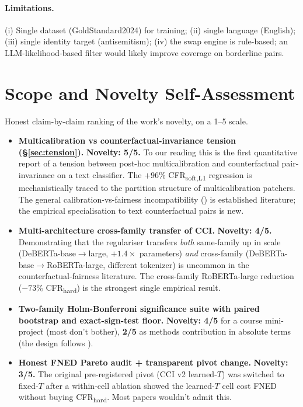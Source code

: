 \documentclass[10pt,a4paper]{article}
\begin{document}
\paragraph{Limitations.} (i) Single dataset (GoldStandard2024) for training;
(ii) single language (English); (iii) single identity target (antisemitism);
(iv) the swap engine is rule-based; an LLM-likelihood-based filter would
likely improve coverage on borderline pairs.

\section{Scope and Novelty Self-Assessment}

Honest claim-by-claim ranking of the work's novelty, on a 1--5 scale.

\begin{itemize}[leftmargin=*,itemsep=2pt]
\item \textbf{Multicalibration vs counterfactual-invariance tension (\S\ref{sec:tension}).}
\textbf{Novelty: 5/5.} To our reading this is the first quantitative report
of a tension between post-hoc multicalibration and counterfactual
pair-invariance on a text classifier. The $+96\%$ CFR\textsubscript{soft,L1}
regression is mechanistically traced to the partition structure of
multicalibration patchers. The general calibration-vs-fairness incompatibility
(\citet{pleiss2017fairness}) is established literature; the empirical
specialisation to text counterfactual pairs is new.

\item \textbf{Multi-architecture cross-family transfer of CCI.}
\textbf{Novelty: 4/5.} Demonstrating that the regulariser transfers
\emph{both} same-family up in scale (DeBERTa-base$\to$large, $+1.4\times$
parameters) \emph{and} cross-family (DeBERTa-base$\to$RoBERTa-large,
different tokenizer) is uncommon in the counterfactual-fairness
literature. The cross-family RoBERTa-large reduction
($-73\%$ CFR\textsubscript{hard}) is the strongest single empirical result.

\item \textbf{Two-family Holm-Bonferroni significance suite with paired
bootstrap and exact-sign-test floor.}
\textbf{Novelty: 4/5} for a course mini-project (most don't bother),
\textbf{2/5} as methods contribution in absolute terms (the design follows
\citet{dror2018hitchhiker}).

\item \textbf{Honest FNED Pareto audit + transparent pivot change.}
\textbf{Novelty: 3/5.} The original pre-registered pivot
(CCI v2 learned-$T$) was switched to fixed-$T$ after a within-cell
ablation showed the learned-$T$ cell cost FNED without buying
CFR\textsubscript{hard}. Most papers wouldn't admit this.


\end{itemize}
\end{document}
